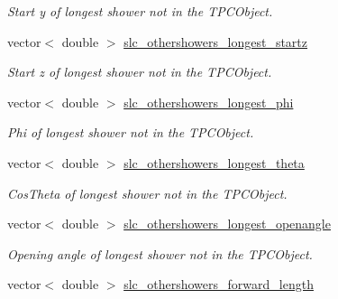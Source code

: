 \begin{DoxyCompactItemize}
\begin{DoxyCompactList}\small\item\em Start y of longest shower not in the T\-P\-C\-Object. \end{DoxyCompactList}\item 
\hypertarget{classUBXSecEvent_a3f6228996c37c36970d12027ad4f18c0}{vector$<$ double $>$ \hyperlink{classUBXSecEvent_a3f6228996c37c36970d12027ad4f18c0}{slc\-\_\-othershowers\-\_\-longest\-\_\-startz}}\label{classUBXSecEvent_a3f6228996c37c36970d12027ad4f18c0}

\begin{DoxyCompactList}\small\item\em Start z of longest shower not in the T\-P\-C\-Object. \end{DoxyCompactList}\item 
\hypertarget{classUBXSecEvent_a8a628a8cfd9d1de43eada6624bfe507e}{vector$<$ double $>$ \hyperlink{classUBXSecEvent_a8a628a8cfd9d1de43eada6624bfe507e}{slc\-\_\-othershowers\-\_\-longest\-\_\-phi}}\label{classUBXSecEvent_a8a628a8cfd9d1de43eada6624bfe507e}

\begin{DoxyCompactList}\small\item\em Phi of longest shower not in the T\-P\-C\-Object. \end{DoxyCompactList}\item 
\hypertarget{classUBXSecEvent_a5750b8ea2fc8ff38bf4d9c478635b602}{vector$<$ double $>$ \hyperlink{classUBXSecEvent_a5750b8ea2fc8ff38bf4d9c478635b602}{slc\-\_\-othershowers\-\_\-longest\-\_\-theta}}\label{classUBXSecEvent_a5750b8ea2fc8ff38bf4d9c478635b602}

\begin{DoxyCompactList}\small\item\em Cos\-Theta of longest shower not in the T\-P\-C\-Object. \end{DoxyCompactList}\item 
\hypertarget{classUBXSecEvent_a7460ed30abe2074204ed5065c21d9877}{vector$<$ double $>$ \hyperlink{classUBXSecEvent_a7460ed30abe2074204ed5065c21d9877}{slc\-\_\-othershowers\-\_\-longest\-\_\-openangle}}\label{classUBXSecEvent_a7460ed30abe2074204ed5065c21d9877}

\begin{DoxyCompactList}\small\item\em Opening angle of longest shower not in the T\-P\-C\-Object. \end{DoxyCompactList}\item 
\hypertarget{classUBXSecEvent_a7ae1fe5c2f338ebbb8a3d9ca5f507f00}{vector$<$ double $>$ \hyperlink{classUBXSecEvent_a7ae1fe5c2f338ebbb8a3d9ca5f507f00}{slc\-\_\-othershowers\-\_\-forward\-\_\-length}}\label{classUBXSecEvent_a7ae1fe5c2f338ebbb8a3d9ca5f507f00}


\end{DoxyCompactItemize}
